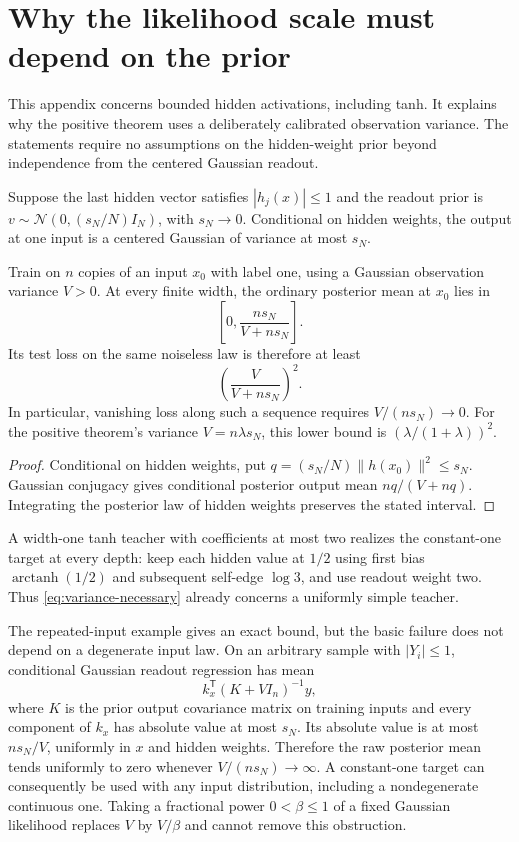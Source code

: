 \section{Why the likelihood scale must depend on the prior}
\label{sec:normalization}
This appendix concerns bounded hidden activations, including tanh. It explains why the positive theorem uses a deliberately calibrated observation variance. The statements require no assumptions on the hidden-weight prior beyond independence from the centered Gaussian readout.

Suppose the last hidden vector satisfies $|h_j(x)|\le1$ and the readout prior is
$v\sim\mathcal N(0,(s_N/N)I_N)$, with $s_N\to0$. Conditional on hidden weights, the output at one input is a centered Gaussian of variance at most $s_N$.

\begin{proposition}
\label{prop:fixed-variance-failure}
Train on $n$ copies of an input $x_0$ with label one, using a Gaussian observation variance $V>0$. At every finite width, the ordinary posterior mean at $x_0$ lies in
\[
 \left[0,\frac{ns_N}{V+ns_N}\right].
\]
Its test loss on the same noiseless law is therefore at least
\begin{equation}
 \left(\frac{V}{V+ns_N}\right)^2.
 \label{eq:variance-necessary}
\end{equation}
In particular, vanishing loss along such a sequence requires $V/(ns_N)\to0$. For the positive theorem's variance $V=n\lambda s_N$, this lower bound is $(\lambda/(1+\lambda))^2$.
\end{proposition}
\begin{proof}
Conditional on hidden weights, put $q=(s_N/N)\|h(x_0)\|^2\le s_N$. Gaussian conjugacy gives conditional posterior output mean $nq/(V+nq)$. Integrating the posterior law of hidden weights preserves the stated interval.
\end{proof}

A width-one tanh teacher with coefficients at most two realizes the constant-one target at every depth: keep each hidden value at $1/2$ using first bias $\operatorname{arctanh}(1/2)$ and subsequent self-edge $\log3$, and use readout weight two. Thus \eqref{eq:variance-necessary} already concerns a uniformly simple teacher.

The repeated-input example gives an exact bound, but the basic failure does not depend on a degenerate input law. On an arbitrary sample with $|Y_i|\le1$, conditional Gaussian readout regression has mean
\[
 k_x^{\mathsf T}(K+VI_n)^{-1}y,
\]
where $K$ is the prior output covariance matrix on training inputs and every component of $k_x$ has absolute value at most $s_N$. Its absolute value is at most $ns_N/V$, uniformly in $x$ and hidden weights. Therefore the raw posterior mean tends uniformly to zero whenever $V/(ns_N)\to\infty$. A constant-one target can consequently be used with any input distribution, including a nondegenerate continuous one. Taking a fractional power $0<\beta\le1$ of a fixed Gaussian likelihood replaces $V$ by $V/\beta$ and cannot remove this obstruction.

